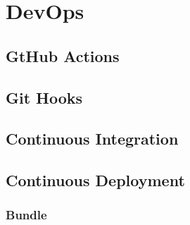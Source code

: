 \chapter{DevOps}
\label{cha:devops}

\section{GtHub Actions}
\label{sec:devops_github_actions}

\section{Git Hooks}
\label{sec:devops_git_hooks}

\section{Continuous Integration}
\label{sec:devops_continuous_integration}

\section{Continuous Deployment}
\label{sec:devops_continuous_deployment}

\subsection{Bundle}
\label{subsec:devops_continuous_deployment_bundle}
